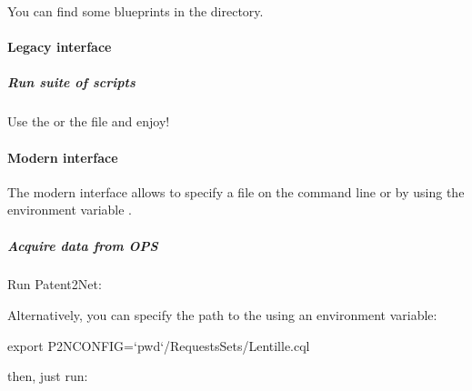 \documentclass[letterpaper,10pt,english]{sphinxmanual}
\begin{document}
You can find some blueprints in the  directory.


\paragraph{Legacy interface}
\label{\detokenize{usage/classic:legacy-interface}}

\subparagraph{Run suite of scripts}
\label{\detokenize{usage/classic:run-suite-of-scripts}}
Use the  or the  file and enjoy!


\paragraph{Modern interface}
\label{\detokenize{usage/classic:modern-interface}}
The modern interface allows to specify a  file on the command line
or by using the environment variable .


\subparagraph{Acquire data from OPS}
\label{\detokenize{usage/classic:acquire-data-from-ops}}
Run Patent2Net:

\begin{sphinxVerbatim}[commandchars=\\\{\}]
  
\end{sphinxVerbatim}

Alternatively, you can specify the path to the  using an environment variable:

\begin{sphinxVerbatim}[commandchars=\\\{\}]
export P2N\PYGZus{}CONFIG=`pwd`/RequestsSets/Lentille.cql
\end{sphinxVerbatim}

then, just run:

\begin{sphinxVerbatim}[commandchars=\\\{\}]
 

  
\end{sphinxVerbatim}
\end{document}

